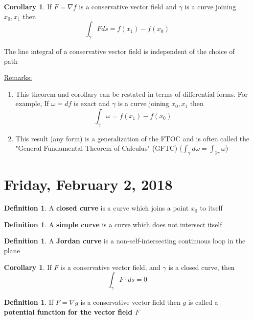 \documentclass[12pt]{article}
\theoremstyle{plain}
\theoremstyle{definition}
\newtheorem{definition}[theorem]{Definition}
\newtheorem{corollary}[theorem]{Corollary}
\begin{document}
\begin{corollary}
	If $F = \nabla f$ is a conservative vector field and $\gamma$ is a curve joining $x_0, x_1$ then
	$$\int_\gamma Fds = f(x_1) - f(x_0)$$
\end{corollary}

The line integral of a conservative vector field is independent of the choice of path

\underline{Remarks:}
\begin{enumerate}
	\item{This theorem and corollary can be restated in terms of differential forms. For example, If $\omega = df$ is exact and $\gamma$ is a curve joining $x_0, x_1$ then $$\int_\gamma \omega = f(x_1) - f(x_0)$$}
	\item{
	This result (any form) is a generalization of the FTOC and is often called the "General Fundamental Theorem of Calculus" (GFTC) ($\int_\gamma d\omega = \int_{\partial \gamma} \omega$)
	}
\end{enumerate}

\newpage

\section{Friday, February 2, 2018}

\begin{definition}
  A \textbf{closed curve} is a curve which joins a point $x_0$ to itself
\end{definition}

\begin{definition}
  A \textbf{simple curve} is a curve which does not intersect itself
\end{definition}

\begin{definition}
  A \textbf{Jordan curve} is a non-self-intersecting continuous loop in the plane
\end{definition}

\begin{corollary}
  If $F$ is a conservative vector field, and $\gamma$ is a closed curve, then
  $$\int_\gamma F\cdot ds = 0$$
\end{corollary}

\begin{definition}
  If $F=\nabla g$ is a conservative vector field then $g$ is called a \textbf{potential function for the vector field $F$}
\end{definition}
\end{document}
